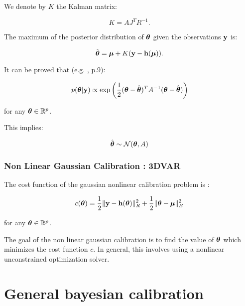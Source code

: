 \documentclass[aspectratio=169]{beamer}
\begin{document}
\begin{frame}

We denote by $K$ the Kalman matrix:

$$
K = A J^T R^{-1}.
$$

The maximum of the posterior distribution of $\boldsymbol{\theta}$ given
the observations ${\bf y}$ is:

$$
\hat{\boldsymbol{\theta}} = \boldsymbol{\mu} + K ({\bf y} - {\bf h}(\boldsymbol{\mu})).
$$


It can be proved that (e.g. \cite{RasmussenWilliams}, p.9):

$$
   p(\boldsymbol{\theta} | {\bf y}) \propto 
   \exp\left(\frac{1}{2} (\boldsymbol{\theta} - \hat{\boldsymbol{\theta}})^T A^{-1} (\boldsymbol{\theta} - \hat{\boldsymbol{\theta}}) \right)
$$

for any $\boldsymbol{\theta}\in\mathbb{R}^p$.

This implies:

$$
\hat{\boldsymbol{\theta}} \sim \mathcal{N}(\boldsymbol{\theta},A)
$$
\end{frame}


\begin{frame}
\frametitle{Non Linear Gaussian Calibration : 3DVAR}

The cost function of the gaussian nonlinear calibration problem is :

$$
c(\boldsymbol{\theta}) = \frac{1}{2}\|{\bf y}-{\bf h}(\boldsymbol{\theta})\|^2_R 
   + \frac{1}{2}\|\boldsymbol{\theta}-\boldsymbol{\mu} \|^2_B
$$

for any $\boldsymbol{\theta}\in\mathbb{R}^p$.

The goal of the non linear gaussian calibration is to find the value of
$\boldsymbol{\theta}$ which minimizes the cost function $c$. In
general, this involves using a nonlinear unconstrained optimization
solver.


\end{frame}


\section{General bayesian calibration}

\end{document}
